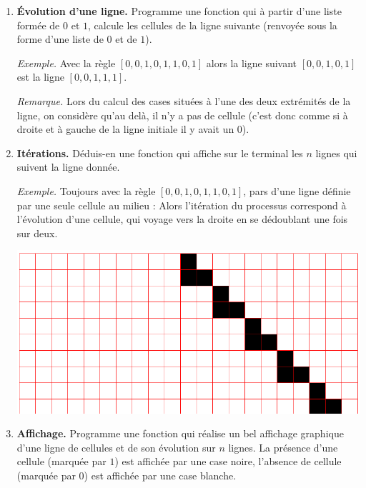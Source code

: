 \documentclass[11pt,class=report,crop=false]{standalone}
\begin{document}
\begin{activite}
\begin{enumerate}
	\item \textbf{Évolution d'une ligne.} Programme une fonction 
	qui à partir d'une liste  formée de $0$ et $1$, calcule
	les cellules de la ligne suivante (renvoyée sous la forme d'une liste de $0$ et de $1$). 
	
	\emph{Exemple.} Avec la règle $[0,0,1,0,1,1,0,1]$ alors la ligne suivant $[0, 0, 1, 0, 1]$ est la ligne $[0, 0, 1, 1, 1]$.
	
	
	\emph{Remarque.} Lors du calcul des cases situées à l'une des deux extrémités de la ligne, on considère qu'au delà, il n'y a pas de cellule (c'est donc comme si à droite et à gauche de la ligne initiale il y avait un $0$).

	
  \item 	\textbf{Itérations.} Déduis-en une fonction  qui affiche sur le terminal les $n$ lignes qui suivent la ligne donnée. 
	
\emph{Exemple.}
Toujours avec la règle $[0,0,1,0,1,1,0,1]$,
pars d'une ligne définie par une seule cellule au milieu :
Alors l'itération du processus correspond à l'évolution d'une cellule,
qui voyage vers la droite en se dédoublant une fois sur deux.

\begin{center}
\includegraphics[scale=\myscale,scale=0.3]{ecran-automate-8}
\end{center}

  \item \textbf{Affichage.} Programme une fonction  qui réalise un bel affichage graphique d'une ligne de cellules et de son évolution sur $n$ lignes.
La présence d'une cellule (marquée par $1$) est affichée par une case noire, l'absence de cellule (marquée par $0$) est affichée par une case blanche. 


\end{enumerate}
\end{activite}
\end{document}

